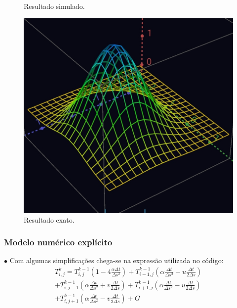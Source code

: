 \documentclass[xcolor=dvipsnames,10pt,aspectratio=169]{beamer}
\begin{document}
\begin{frame}
\begin{minipage}[h!]{0.17\textwidth}
\begin{figure}[h!]
				\caption{Resultado simulado.}
			\end{figure}
			\begin{figure}[h!]
				\centering
				\includegraphics[trim = {0cm 0cm 0cm 0cm}, clip , angle=0, scale=0.07]{images/resultado_analitico}
				\caption{ Resultado exato.}
			\end{figure}
		\end{minipage}
	\end{frame}	





	\begin{frame} 
		\frametitle{Modelo numérico explícito}
		$\bullet$ Com algumas simplificações chega-se na expressão utilizada no código:
		\begin{equation}
			\begin{split}
			T_{i,j}^{k} = T_{i,j}^{k-1} \left( 1 - 4 \frac{\alpha \Delta t}{\Delta s ^2}\right) + T_{i -1, j}^{k-1} \left( \alpha \frac{\Delta t}{\Delta s^2} + u \frac{\Delta t}{2 \Delta s} \right)\\
			+ T_{i,j-1}^{k-1} \left( \alpha \frac{\Delta t}{\Delta s^2} + v \frac{\Delta t}{2 \Delta s} \right) +  T_{i+1,j}^{k-1} \left( \alpha \frac{\Delta t}{ \Delta s^2} - u \frac{\Delta t}{2 \Delta s}\right) \\
			+  T_{i,j+1}^{k-1} \left( \alpha \frac{\Delta t}{\Delta s^2} - v \frac{\Delta t}{2 \Delta s}\right) + G
			\end{split}
		\end{equation}
	\end{frame}
\end{document}

